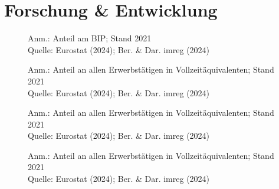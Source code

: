 
\section{Forschung \& Entwicklung}

\begin{figure}[p]
	{\centering {}}
	\label{map:forschausgaben}
	\begin{spacing}{1} \scriptsize
		Anm.: Anteil am BIP; Stand 2021\\
		Quelle: Eurostat (2024); Ber. \& Dar. imreg (2024) \end{spacing}
\end{figure}


\begin{figure}[p]
	{\centering {}}
	\label{map:forscher}
	\begin{spacing}{1} \scriptsize
		Anm.: Anteil an allen Erwerbstätigen in Vollzeitäquivalenten; Stand 2021\\
		Quelle: Eurostat (2024); Ber. \& Dar. imreg (2024) \end{spacing}
\end{figure}


\begin{figure}[p]
	{\centering {}}
	\label{map:forscherunt}
	\begin{spacing}{1} \scriptsize
		Anm.: Anteil an allen Erwerbstätigen in Vollzeitäquivalenten; Stand 2021\\
		Quelle: Eurostat (2024); Ber. \& Dar. imreg (2024) \end{spacing}
\end{figure}


\begin{figure}[p]
	{\centering {}}
	\label{map:forscherhoch}
	\begin{spacing}{1} \scriptsize
		Anm.: Anteil an allen Erwerbstätigen in Vollzeitäquivalenten; Stand 2021\\
		Quelle: Eurostat (2024); Ber. \& Dar. imreg (2024) \end{spacing}
\end{figure}


